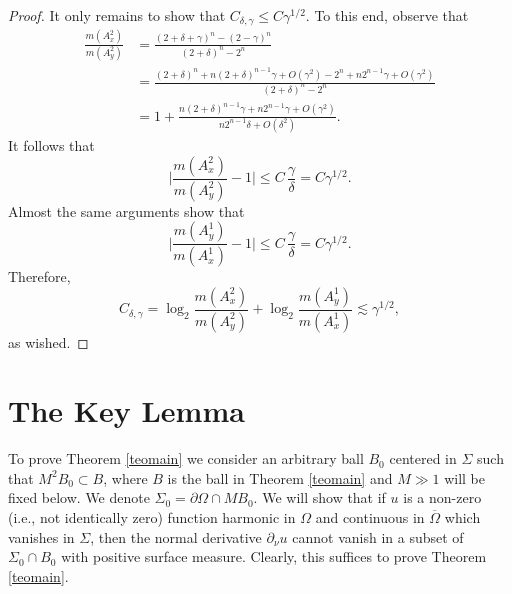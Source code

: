 \documentclass[11pt]{amsart}
\newcommand{\vv}{{\vspace{2mm}}}
\theoremstyle{definition}
\theoremstyle{remark}
\numberwithin{equation}{section}
\begin{document}
\begin{proof}
It only remains to show that $C_{\delta,\gamma}\leq  C\gamma^{1/2}$. To this end, observe that
\begin{align*}
\frac{m(A_x^2)}{m(A_y^2)} &= \frac{(2+\delta+\gamma)^n - (2-\gamma)^n}{(2+\delta)^n- 2^n}\\
& = \frac{(2+\delta)^n + n(2+\delta)^{n-1}\gamma + O(\gamma^2) - 2^n +n2^{n-1}\gamma + O(\gamma^2)}{(2+\delta)^n- 2^n}\\
& = 1 + 
 \frac{ n(2+\delta)^{n-1}\gamma  + n2^{n-1}\gamma + O(\gamma^2)}{n2^{n-1}\delta + O(\delta^2)}.
\end{align*}
It follows that
$$\bigg|\frac{m(A_x^2)}{m(A_y^2)} - 1\bigg|\leq C\,\frac{\gamma}\delta = C\gamma^{1/2}.$$
Almost the same arguments show that
$$\bigg|\frac{m(A_y^1)}{m(A_x^1)} - 1\bigg|\leq C\,\frac{\gamma}\delta = C\gamma^{1/2}.$$
Therefore,
$$C_{\delta,\gamma} = \log_2\frac{m(A_x^2)}{m(A_y^2)} +  \log_2\frac{m(A_y^1)}{m(A_x^1)}\lesssim\gamma^{1/2},$$
as wished.
\end{proof}


\vv


\section{The Key Lemma}\label{seckey}

To prove Theorem \ref{teomain} we consider an arbitrary ball $B_0$ centered in $\Sigma$ such that 
$M^2B_0\subset B$, where
$B$ is the ball in Theorem \ref{teomain} and $M\gg1$ will be fixed below. We denote 
 $\Sigma_0 =
\partial \Omega \cap MB_0$. We will show that if $u$ is a non-zero (i.e., not identically zero) function harmonic in $\Omega$ and continuous in $\overline\Omega$ which vanishes in $\Sigma$, then the normal derivative $\partial_\nu u$ 
cannot vanish
in a subset of $\Sigma_0\cap B_0$ with positive surface measure.
Clearly, this suffices to prove Theorem \ref{teomain}.
\end{document}
